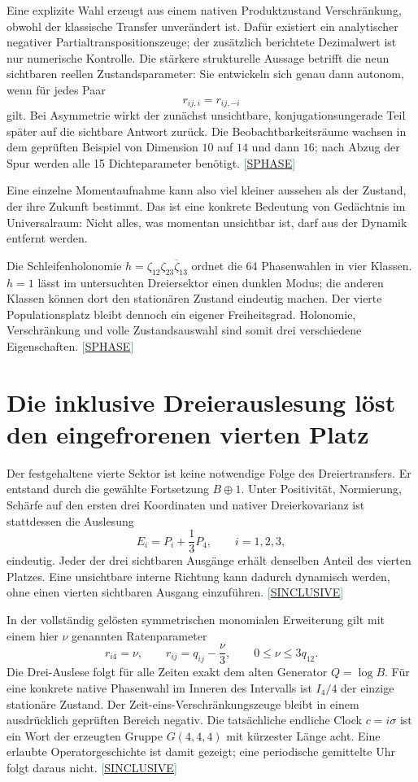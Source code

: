 \documentclass[11pt,a4paper,oneside,parskip=half,headings=normal,numbers=noenddot,bibliography=totoc]{scrreprt}
\newcommand{\src}[1]{\textcolor{teal}{\small[\hyperref[s:#1]{S#1}]}}
\begin{document}
Eine explizite Wahl erzeugt aus einem nativen Produktzustand Verschränkung, obwohl der klassische Transfer unverändert ist. Dafür existiert ein analytischer negativer Partialtranspositionszeuge; der zusätzlich berichtete Dezimalwert ist nur numerische Kontrolle. Die stärkere strukturelle Aussage betrifft die neun sichtbaren reellen Zustandsparameter: Sie entwickeln sich genau dann autonom, wenn für jedes Paar
\[
 r_{ij,i}=r_{ij,-i}
\]
gilt. Bei Asymmetrie wirkt der zunächst unsichtbare, konjugationsungerade Teil später auf die sichtbare Antwort zurück. Die Beobachtbarkeitsräume wachsen in dem geprüften Beispiel von Dimension $10$ auf $14$ und dann $16$; nach Abzug der Spur werden alle 15 Dichteparameter benötigt. \src{PHASE}

Eine einzelne Momentaufnahme kann also viel kleiner aussehen als der Zustand, der ihre Zukunft bestimmt. Das ist eine konkrete Bedeutung von Gedächtnis im Universalraum: Nicht alles, was momentan unsichtbar ist, darf aus der Dynamik entfernt werden.

Die Schleifenholonomie $h=\zeta_{12}\zeta_{23}\overline{\zeta}_{13}$ ordnet die 64 Phasenwahlen in vier Klassen. $h=1$ lässt im untersuchten Dreiersektor einen dunklen Modus; die anderen Klassen können dort den stationären Zustand eindeutig machen. Der vierte Populationsplatz bleibt dennoch ein eigener Freiheitsgrad. Holonomie, Verschränkung und volle Zustandsauswahl sind somit drei verschiedene Eigenschaften. \src{PHASE}

\section{Die inklusive Dreierauslesung löst den eingefrorenen vierten Platz}
Der festgehaltene vierte Sektor ist keine notwendige Folge des Dreiertransfers. Er entstand durch die gewählte Fortsetzung $B\oplus1$. Unter Positivität, Normierung, Schärfe auf den ersten drei Koordinaten und nativer Dreierkovarianz ist stattdessen die Auslesung
\[
 E_i=P_i+\frac13P_4,\qquad i=1,2,3,
\]
eindeutig. Jeder der drei sichtbaren Ausgänge erhält denselben Anteil des vierten Platzes. Eine unsichtbare interne Richtung kann dadurch dynamisch werden, ohne einen vierten sichtbaren Ausgang einzuführen. \src{INCLUSIVE}

In der vollständig gelösten symmetrischen monomialen Erweiterung gilt mit einem hier $\nu$ genannten Ratenparameter
\[
 r_{i4}=\nu,\qquad r_{ij}=q_{ij}-\frac\nu3,\qquad
 0\le\nu\le3q_{12}.
\]
Die Drei-Auslese folgt für alle Zeiten exakt dem alten Generator $Q=\log B$. Für eine konkrete native Phasenwahl im Inneren des Intervalls ist $I_4/4$ der einzige stationäre Zustand. Der Zeit-eins-Verschränkungszeuge bleibt in einem ausdrücklich geprüften Bereich negativ. Die tatsächliche endliche Clock $c=i\sigma$ ist ein Wort der erzeugten Gruppe $G(4,4,4)$ mit kürzester Länge acht. Eine erlaubte Operatorgeschichte ist damit gezeigt; eine periodische gemittelte Uhr folgt daraus nicht. \src{INCLUSIVE}
\end{document}
